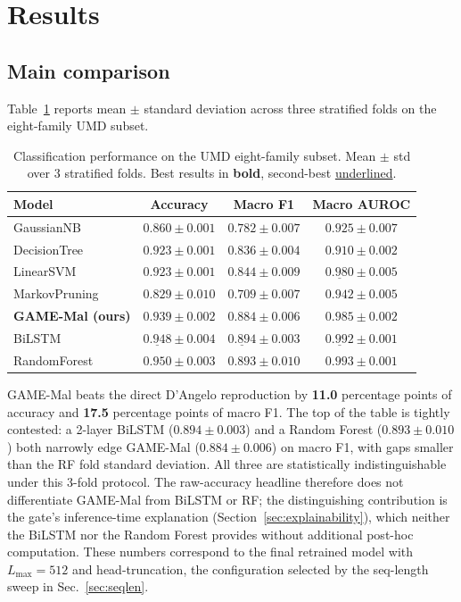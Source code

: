 \section{Results}
\label{sec:results}

\subsection{Main comparison}

Table~\ref{tab:main} reports mean $\pm$ standard deviation across
three stratified folds on the eight-family UMD subset.

\begin{table}[t]
\centering
\caption{Classification performance on the UMD eight-family subset.
Mean $\pm$ std over 3 stratified folds. Best results in \textbf{bold},
second-best \underline{underlined}.}
\label{tab:main}
\small
\begin{tabular}{lccc}
\toprule
Model & Accuracy & Macro F1 & Macro AUROC \\
\midrule
GaussianNB          & $0.860 \pm 0.001$ & $0.782 \pm 0.007$ & $0.925 \pm 0.007$ \\
DecisionTree        & $0.923 \pm 0.001$ & $0.836 \pm 0.004$ & $0.910 \pm 0.002$ \\
LinearSVM           & $0.923 \pm 0.001$ & $0.844 \pm 0.009$ & $\underline{0.980} \pm 0.005$ \\
MarkovPruning~\cite{dangelo2023association} & $0.829 \pm 0.010$ & $0.709 \pm 0.007$ & $0.942 \pm 0.005$ \\
\midrule
\textbf{GAME-Mal (ours)} & $0.939 \pm 0.002$ & $0.884 \pm 0.006$ & $0.985 \pm 0.002$ \\
BiLSTM              & $\underline{0.948} \pm 0.004$ & $\underline{0.894} \pm 0.003$ & $\underline{0.992} \pm 0.001$ \\
RandomForest        & $\mathbf{0.950} \pm 0.003$ & $\mathbf{0.893} \pm 0.010$ & $\mathbf{0.993} \pm 0.001$ \\
\bottomrule
\end{tabular}
\end{table}

GAME-Mal beats the direct D'Angelo reproduction by \textbf{11.0}
percentage points of accuracy and \textbf{17.5} percentage points
of macro F1. The top of the table is tightly contested: a 2-layer
BiLSTM ($0.894 \pm 0.003$) and a Random Forest ($0.893 \pm 0.010$)
both narrowly edge GAME-Mal ($0.884 \pm 0.006$) on macro F1, with
gaps smaller than the RF fold standard deviation. All three are
statistically indistinguishable under this 3-fold protocol. The
raw-accuracy headline therefore does not differentiate GAME-Mal from
BiLSTM or RF; the distinguishing contribution is the gate's
inference-time explanation (Section~\ref{sec:explainability}), which
neither the BiLSTM nor the Random Forest provides without additional
post-hoc computation. These numbers correspond to the final retrained
model with $L_{\max}=512$ and head-truncation, the configuration
selected by the seq-length sweep in Sec.~\ref{sec:seqlen}.

